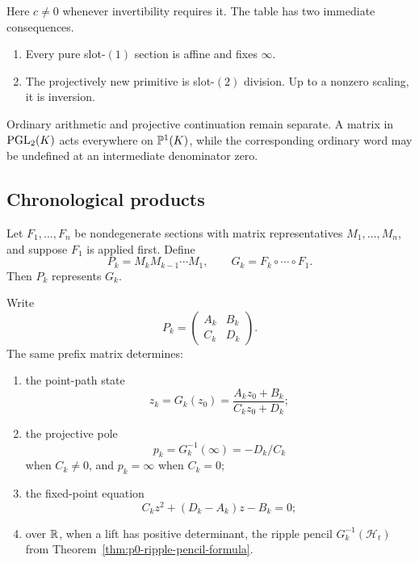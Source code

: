 Here $c\ne0$ whenever invertibility requires it.  The table has two immediate
consequences.

\begin{enumerate}
  \item Every pure slot-$(1)$ section is affine and fixes $\infty$.
  \item The projectively new primitive is slot-$(2)$ division.  Up to a
  nonzero scaling, it is inversion.
\end{enumerate}

Ordinary arithmetic and projective continuation remain separate.  A matrix in
$\operatorname{PGL}_2(K)$ acts everywhere on $\mathbb{P}^1(K)$, while the corresponding ordinary
word may be undefined at an intermediate denominator zero.

\subsection{Chronological products}

Let $F_1,\ldots,F_n$ be nondegenerate sections with matrix representatives
$M_1,\ldots,M_n$, and suppose $F_1$ is applied first.  Define
\begin{equation}\label{eq:p0-prefix-matrices}
  P_k=M_kM_{k-1}\cdots M_1,
  \qquad
  G_k=F_k\circ\cdots\circ F_1.
\end{equation}
Then $P_k$ represents $G_k$.

\begin{theorem}
\label{thm:p0-four-matrix-readings}
Write
\[
  P_k=\begin{pmatrix}A_k&B_k\\C_k&D_k\end{pmatrix}.
\]
The same prefix matrix determines:

\begin{enumerate}
  \item the point-path state
  \[
    z_k=G_k(z_0)=\frac{A_kz_0+B_k}{C_kz_0+D_k};
  \]

  \item the projective pole
  \[
    p_k=G_k^{-1}(\infty)
      =-D_k/C_k
  \]
  when $C_k\ne0$, and $p_k=\infty$ when $C_k=0$;

  \item the fixed-point equation
  \[
    C_kz^2+(D_k-A_k)z-B_k=0;
  \]

  \item over $\mathbb{R}$, when a lift has positive determinant, the ripple pencil
  $G_k^{-1}(\mathcal H_t)$ from
  Theorem~\ref{thm:p0-ripple-pencil-formula}.
\end{enumerate}
\end{theorem}

